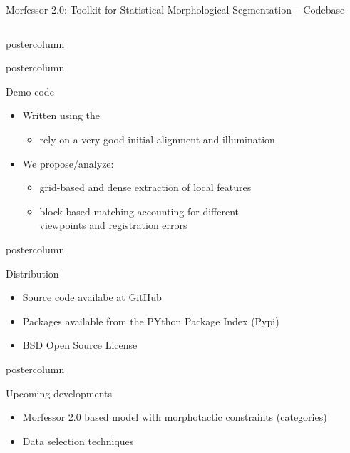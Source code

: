 \documentclass[final]{beamer} %
\begin{document}
\begin{frame}{Morfessor 2.0: Toolkit for Statistical Morphological Segmentation -- Codebase}
\begin{columns}
\begin{column}{.3\textwidth}
\begin{beamercolorbox}[center,wd=\textwidth]{postercolumn}
	\end{beamercolorbox}


  \begin{beamercolorbox}[center,wd=\textwidth]{postercolumn}
 \begin{block}{Demo code}
              \begin{itemize}
              \item Written using the 
                \begin{itemize}
                \item rely on a very good initial alignment and illumination
                \end{itemize}
              \item We propose/analyze:
                \begin{itemize}
                \item grid-based and dense extraction of local features
                \item block-based matching accounting for different\\
	                  viewpoints and registration errors
                \end{itemize}
              \end{itemize}              
            \end{block}
            
	\end{beamercolorbox}



  \begin{beamercolorbox}[center,wd=\textwidth]{postercolumn}
 \begin{block}{Distribution}
              \begin{itemize}
              \item Source code availabe at GitHub
		\item Packages available from the PYthon Package Index (Pypi)
              \item BSD Open Source License
\end{itemize}
            \end{block}
            
	\end{beamercolorbox}


  \begin{beamercolorbox}[center,wd=\textwidth]{postercolumn}
 \begin{block}{Upcoming developments}
              \begin{itemize}
		\item Morfessor 2.0 based model with morphotactic constraints (categories) 
              \item Data selection techniques
		

\end{itemize}
\end{block}
\end{beamercolorbox}
\end{column}
\end{columns}
\end{frame}
\end{document}
